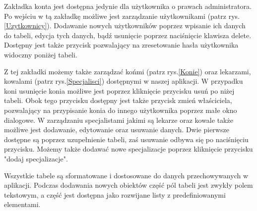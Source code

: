 \documentclass[12pt,oneside]{report}
\begin{document}
Zakładka konta jest dostępna jedynie dla użytkownika o prawach administratora. Po wejściu w tą zakładkę możliwe jest zarządzanie użytkownikami (patrz rys.\ref{Uzytkownicy}). Dodawanie nowych użytkowników poprzez wpisanie ich danych do tabeli, edycja tych danych, bądź usunięcie poprzez naciśnięcie klawisza delete. Dostępny jest także przycisk pozwalający na zresetowanie hasła użytkownika widoczny poniżej tabeli.

Z tej zakładki możemy także zarządzać końmi (patrz rys.\ref{Konie}) oraz lekarzami, kowalami (patrz rys.\ref{Specjalisci}) dostępnymi w naszej aplikacji. W przypadku koni usunięcie konia możliwe jest poprzez kliknięcie przycisku usuń po niżej tabeli. Obok tego przycisku dostępny jest także przycisk zmień właściciela, pozwalający na przypisanie konia do innego użytkownika poprzez małe okno dialogowe. W zarządzaniu specjalistami jakimi są lekarze oraz kowale także możliwe jest dodawanie, edytowanie oraz usuwanie danych. Dwie pierwsze dostępne są poprzez uzupełnienie tabeli, zaś usuwanie odbywa się po naciśnięciu przycisku. Możemy także dodawać nowe specjalizacje poprzez kliknięcie przycisku "dodaj specjalizacje".

Wszystkie tabele są sformatowane i dostosowane do danych przechowywanych w aplikacji. Podczas dodawania nowych obiektów część pól tabeli jest zwykły polem tekstowym, a część jest dostępna jako rozwijane listy z predefiniowanymi elementami.
\end{document}

